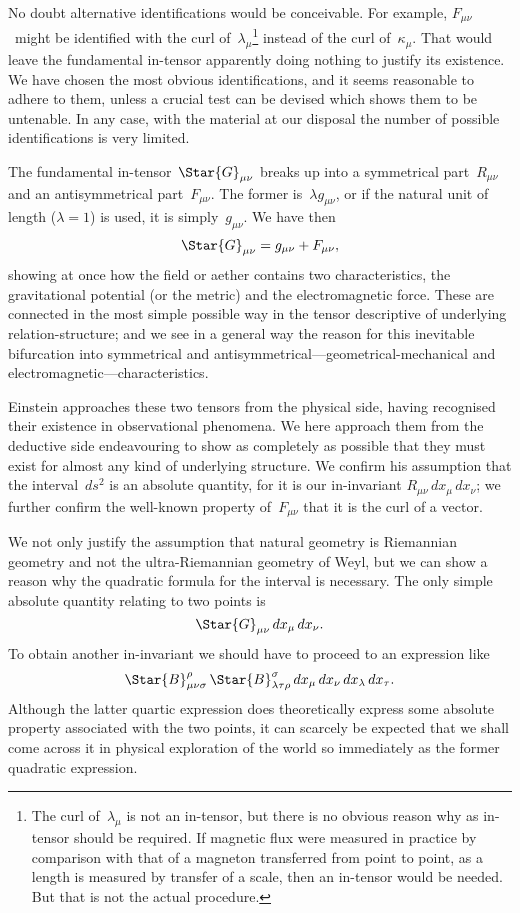 \documentclass[12pt]{book}
\begin{document}
No doubt alternative identifications would be conceivable. For example,
$F_{\mu\nu}$~might be identified with the curl of~$\lambda_{\mu}$\footnote
  {The curl of~$\lambda_{\mu}$ is not an in-tensor, but there is no obvious reason why as in-tensor should
  be required. If magnetic flux were measured in practice by comparison with that of a magneton
  transferred from point to point, as a length is measured by transfer of a scale, then an in-tensor
  would be needed. But that is not the actual procedure.}
instead of the curl of~$\kappa_{\mu}$. That
would leave the fundamental in-tensor apparently doing nothing to justify its
existence. We have chosen the most obvious identifications, and it seems
reasonable to adhere to them, unless a crucial test can be devised which shows
them to be untenable. In any case, with the material at our disposal the
number of possible identifications is very limited.

%

The fundamental in-tensor~$\Star{G}_{\mu\nu}$ breaks up into a symmetrical part~$R_{\mu\nu}$
and an antisymmetrical part~$F_{\mu\nu}$. The former is~$\lambda g_{\mu\nu}$, or if the natural unit
of length ($\lambda = 1$) is used, it is simply~$g_{\mu\nu}$. We have then
\[
\Star{G}_{\mu\nu} = g_{\mu\nu} + F_{\mu\nu},
\]
showing at once how the field or aether contains two characteristics, the
%
gravitational potential (or the metric) and the electromagnetic force. These
are connected in the most simple possible way in the tensor descriptive of
underlying relation-structure; and we see in a general way the reason for this
%
inevitable bifurcation into symmetrical and antisymmetrical---geometrical-mechanical
and electromagnetic---characteristics.

Einstein approaches these two tensors from the physical side, having
recognised their existence in observational phenomena. We here approach
them from the deductive side endeavouring to show as completely as possible
that they must exist for almost any kind of underlying structure. We confirm
his assumption that the interval~$ds^{2}$ is an absolute quantity, for it is our in-invariant
$R_{\mu\nu}\, dx_{\mu}\, dx_{\nu}$; we further confirm the well-known property of~$F_{\mu\nu}$ that
it is the curl of a vector.

We not only justify the assumption that natural geometry is Riemannian
geometry and not the ultra-Riemannian geometry of Weyl, but we can show
a reason why the quadratic formula for the interval is necessary. The only
simple absolute quantity relating to two points is
\[
\Star{G}_{\mu\nu}\, dx_{\mu}\, dx_{\nu}.
\]
To obtain another in-invariant we should have to proceed to an expression like
\[
\Star{B}_{\mu\nu\sigma}^{\rho}\, \Star{B}_{\lambda\tau\rho}^{\sigma}\, dx_{\mu}\, dx_{\nu}\, dx_{\lambda}\, dx_{\tau}.
\]
Although the latter quartic expression does theoretically express some absolute
property associated with the two points, it can scarcely be expected that
we shall come across it in physical exploration of the world so immediately as
the former quadratic expression.
\end{document}
